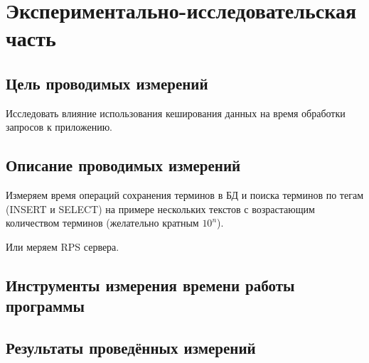 \section{Экспериментально-исследовательская часть}

\subsection{Цель проводимых измерений}

Исследовать влияние использования кеширования данных на время обработки запросов к приложению. 
	
\subsection{Описание проводимых измерений}

Измеряем время операций сохранения терминов в БД и поиска терминов по тегам (INSERT и SELECT) на примере нескольких текстов с возрастающим количеством терминов (желательно кратным $10^n$).

Или меряем RPS сервера.
	
\subsection{Инструменты измерения времени работы программы}
		
\subsection{Результаты проведённых измерений}

\pagebreak